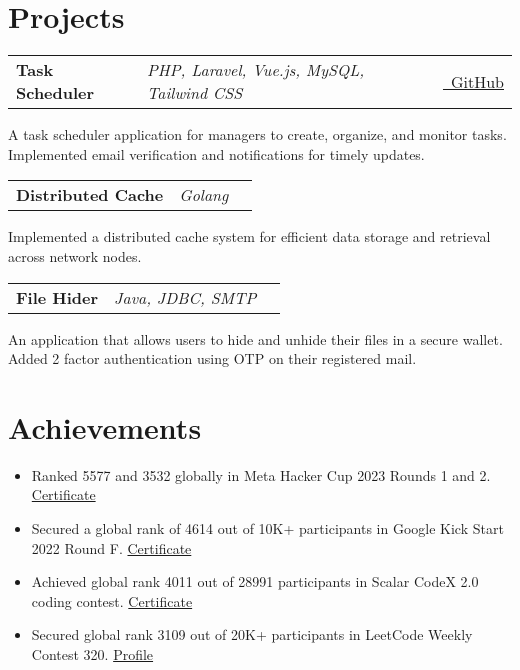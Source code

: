 \documentclass[a4paper,10pt]{article}
\makeatletter
\newenvironment{jobshort}[3]
    {
    \begin{tabularx}{\linewidth}{@{}l X r@{}}
    \textbf{#1} & \textit{#2} &  #3 \\[3pt]
    \end{tabularx}
    }
    {
    }
\makeatother
\begin{document}
  
\section{Projects}
\vspace{-4pt}
\begin{jobshort}{Task Scheduler}{PHP, Laravel, Vue.js, MySQL, Tailwind CSS}{\href{https://github.com/sagnik6969/task_scheduler_frontend}{\raisebox{-0.05\height}\faGithub\ GitHub}}
    A task scheduler application for managers to create, organize, and monitor tasks. Implemented email verification and
notifications for timely updates.
\end{jobshort}

\begin{jobshort}{Distributed Cache}{Golang}{}
    Implemented a distributed cache system for efficient data storage and retrieval across network nodes.
\end{jobshort}

\begin{jobshort}{File Hider}{Java, JDBC, SMTP}{}
    An application that allows users to hide and unhide their files in a secure wallet. Added 2 factor authentication using OTP
    on their registered mail.
\end{jobshort}




\section{Achievements}
\vspace{-4pt}
\begin{itemize}[nosep,after=\strut, leftmargin=1em, itemsep=2pt,label=--]
    \item Ranked 5577 and 3532 globally in Meta Hacker Cup 2023 Rounds 1 and 2. \href{https://www.facebook.com/codingcompetitions/hacker-cup/2023/certificate/2037824066570201}{Certificate}
    \item Secured a global rank of 4614 out of 10K+ participants in Google Kick Start 2022 Round F. \href{https://drive.google.com/file/d/1yJX57VkI7LnC7MsX_Wz_063uCRgkH8W3/view}{Certificate}
    \item Achieved global rank 4011 out of 28991 participants in Scalar CodeX 2.0 coding contest. \href{https://moonshot.scaler.com/s/sl/p3M5EL9en3}{Certificate}
    \item Secured global rank 3109 out of 20K+ participants in LeetCode Weekly Contest 320. \href{https://leetcode.com/u/sameertri039/}{Profile}
\end{itemize}
\end{document}

